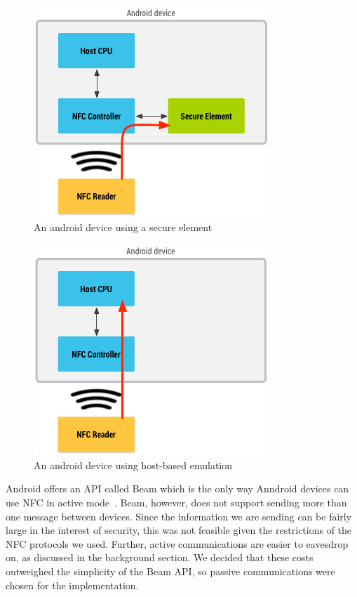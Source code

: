 \documentclass[12pt]{report}
\begin{document}
\begin{figure}[!h]
    \centering
    \includegraphics[width=0.6 \textwidth]{Diagrams/NFC-Diagrams/Android-Secure-Element}
    \caption[Secure element operation on an Android device]{An android device using a secure element~\autocite{ANDROIDHCE}}
    \label{fig:android-secure-element}
\end{figure}

\begin{figure}
    \centering
    \includegraphics[width=0.6 \textwidth]{Diagrams/NFC-Diagrams/Android-Host-Based-Card}
    \caption[Host-based card emulation on an Android device]{An android device using host-based emulation~\autocite{ANDROIDHCE}}
    \label{fig:android-host-based}
\end{figure}

Android offers an API called Beam which is the only way Anndroid devices can use NFC in active mode~\autocite{ANDROIDBEAM}. Beam,
however, does not support sending more than one message between devices. Since the information we are sending can be
fairly large in the interest of security, this was not feasible given the restrictions of the NFC protocols we used.
Further, active communications are easier to eavesdrop on, as discussed in the background section. We decided that these
costs outweighed the simplicity of the Beam API, so passive communications were chosen for the implementation.
\end{document}
